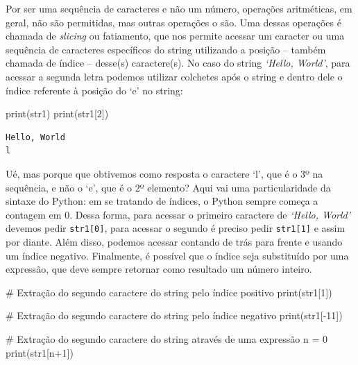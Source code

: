 \documentclass[
  brazilian,
  letterpaper,
  DIV=11,
  numbers=noendperiod]{scrreprt}
\newenvironment{Shaded}{\begin{snugshade}}{\end{snugshade}}
\newcommand{\BuiltInTok}[1]{\textcolor[rgb]{0.00,0.23,0.31}{#1}}
\newcommand{\CommentTok}[1]{\textcolor[rgb]{0.37,0.37,0.37}{#1}}
\newcommand{\DecValTok}[1]{\textcolor[rgb]{0.68,0.00,0.00}{#1}}
\newcommand{\NormalTok}[1]{\textcolor[rgb]{0.00,0.23,0.31}{#1}}
\newcommand{\OperatorTok}[1]{\textcolor[rgb]{0.37,0.37,0.37}{#1}}
\begin{document}
Por ser uma sequência de caracteres e não um número, operações
aritméticas, em geral, não são permitidas, mas outras operações o são.
Uma dessas operações é chamada de \emph{slicing} ou fatiamento, que nos
permite acessar um caracter ou uma sequência de caracteres específicos
do string utilizando a posição -- também chamada de índice -- desse(s)
caractere(s). No caso do string \emph{`Hello, World'}, para acessar a
segunda letra podemos utilizar colchetes após o string e dentro dele o
índice referente à posição do `e' no string:

\begin{Shaded}
\begin{Highlighting}[]
\BuiltInTok{print}\NormalTok{(str1)}
\BuiltInTok{print}\NormalTok{(str1[}\DecValTok{2}\NormalTok{])}
\end{Highlighting}
\end{Shaded}

\begin{verbatim}
Hello, World
l
\end{verbatim}

Ué, mas porque que obtivemos como resposta o caractere `l', que é o 3º
na sequência, e não o `e', que é o 2º elemento? Aqui vai uma
particularidade da sintaxe do Python: em se tratando de índices, o
Python sempre começa a contagem em 0. Dessa forma, para acessar o
primeiro caractere de \emph{`Hello, World'} devemos pedir
\texttt{str1{[}0{]}}, para acessar o segundo é preciso pedir
\texttt{str1{[}1{]}} e assim por diante. Além disso, podemos acessar
contando de trás para frente e usando um índice negativo. Finalmente, é
possível que o índice seja substituído por uma expressão, que deve
sempre retornar como resultado um número inteiro.

\begin{Shaded}
\begin{Highlighting}[]
\CommentTok{\# Extração do segundo caractere do string pelo índice positivo}
\BuiltInTok{print}\NormalTok{(str1[}\DecValTok{1}\NormalTok{])}

\CommentTok{\# Extração do segundo caractere do string pelo índice negativo}
\BuiltInTok{print}\NormalTok{(str1[}\OperatorTok{{-}}\DecValTok{11}\NormalTok{])}

\CommentTok{\# Extração do segundo caractere do string através de uma expressão}
\NormalTok{n }\OperatorTok{=} \DecValTok{0}
\BuiltInTok{print}\NormalTok{(str1[n}\OperatorTok{+}\DecValTok{1}\NormalTok{])}
\end{Highlighting}
\end{Shaded}
\end{document}

